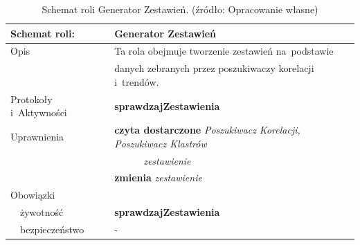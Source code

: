 \documentclass[11pt]{report}
\begin{document}
    \begin{table}[ht!]
        \begin{tabular}{ll}
            Schemat roli:          & Generator Zestawień                                                          \\ \hline
            Opis                   & Ta rola obejmuje tworzenie zestawień na~podstawie                            \\
            & danych zebranych przez poszukiwaczy korelacji i~trendów.                     \\
            Protokoły i~Aktywności & \textbf{sprawdzajZestawienia}                                                \\
            Uprawnienia            & \textbf{czyta dostarczone} \textit{Poszukiwacz Korelacji, Poszukiwacz Klastrów} \\
            & ~~~~~~\textit{zestawienie}                                                   \\
            & \textbf{zmienia} \textit{zestawienie}                                        \\
            Obowiązki              &                                                                              \\
            ~~żywotność            & \textbf{sprawdzajZestawienia}                                                \\
            ~~bezpieczeństwo       & -                                                                            \\
        \end{tabular}
        \caption{Schemat roli Generator Zestawień. (źródło: Opracowanie własne)}
        \label{tab:schemat roli Generator Zestawień}
    \end{table}
\end{document}
